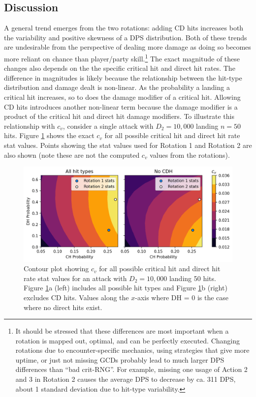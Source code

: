 \documentclass{article}
\begin{document}
        \subsection{Discussion}
        A general trend emerges from the two rotations: adding CD hits increases both the variability and positive skewness of a DPS distribution. Both of these trends are undesirable from the perspective of dealing more damage as doing so becomes more reliant on chance than player/party skill.\footnote{It should be stressed that these differences are most important when a rotation is mapped out, optimal, and can be perfectly executed. Changing rotations due to encounter-specific mechanics, using strategies that give more uptime, or just not missing GCDs probably lead to much larger DPS differences than ``bad crit-RNG''. For example, missing one usage of Action 2 and 3 in Rotation 2 causes the average DPS to decrease by ca. 311 DPS, about 1 standard deviation due to hit-type variability.} The exact magnitude of these changes also depends on the the specific critical hit and direct hit rates. The difference in magnitudes is likely because the relationship between the hit-type distribution and damage dealt is non-linear. As the probability a landing a critical hit increases, so to does the damage modifier of a critical hit. Allowing CD hits introduces another non-linear term because the damage modifier is a product of the critical hit and direct hit damage modifiers. To illustrate this relationship with $c_v$, consider a single attack with $D_2 = 10,000$ landing $n = 50$ hits. Figure \ref{fig:ch-dh-scan} shows the exact $c_v$ for all possible critical hit and direct hit rate stat values. Points showing the stat values used for Rotation 1 and Rotation 2 are also shown (note these are not the computed $c_v$ values from the rotations).

        \begin{figure}[H]
            \centering
            \includegraphics[width=0.9\linewidth]{img/ch-dh-scan.PNG}
            \caption{Contour plot showing $c_v$ for all possible critical hit and direct hit rate stat values for an attack with $D_2 = 10,000$ landing 50 hits. Figure \ref{fig:ch-dh-scan}a (left) includes all possible hit types and Figure \ref{fig:ch-dh-scan}b (right) excludes CD hits. Values along the $x$-axis where DH = $0$ is the case where no direct hits exist.}\label{fig:ch-dh-scan}
        \end{figure}
\end{document}
